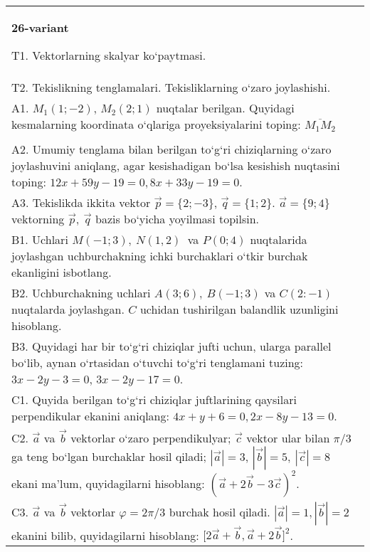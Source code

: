 \documentclass{article}
\begin{document}
\begin{tabular}{m{17cm}}
\textbf{26-variant}

T1. 
Vektorlarning skalyar ko‘paytmasi.
 \\
T2. 
Tekislikning tenglamalari. Tekisliklarning o‘zaro joylashishi.
 \\
A1. 
$M_1 (1; -2) $, $M_2 (2; 1) $ nuqtalar berilgan.
Quyidagi kesmalarning koordinata o‘qlariga proyeksiyalarini toping: $\overline{M_1M_2}$ \\
 \\
A2. 
Umumiy tenglama bilan berilgan to‘g‘ri chiziqlarning
o‘zaro joylashuvini aniqlang, agar kesishadigan bo‘lsa kesishish nuqtasini
toping: $12x+59y-19=0, 8x+33y-19=0$.
 \\
A3. 
Tekislikda ikkita vektor
$\overrightarrow{p} = \{ 2; - 3\}$, $\overrightarrow{q} = \{ 1;2\}$.
$\overrightarrow{a} = \{9;4\}$ vektorning
$\overrightarrow{p},\ \overrightarrow{q}$ bazis bo‘yicha yoyilmasi topilsin.
 \\
B1. 
Uchlari \(M (-1;3),\ N (1,2) \ \) va \(P (0;4) \)
nuqtalarida joylashgan uchburchakning ichki burchaklari o‘tkir burchak
ekanligini isbotlang.
 \\
B2. 
Uchburchakning uchlari \(A (3;6),\ B (-1;3) \) va
\(C (2:-1) \) nuqtalarda joylashgan. $C$ uchidan tushirilgan balandlik uzunligini hisoblang.
 \\
B3. 
Quyidagi har bir to‘g‘ri chiziqlar jufti uchun, ularga parallel
bo‘lib, aynan o‘rtasidan o‘tuvchi to‘g‘ri tenglamani tuzing: $3x-2y-3=0$, $3x-2y-17=0$.
 \\
C1. 
Quyida berilgan to‘g‘ri chiziqlar juftlarining qaysilari
perpendikular ekanini aniqlang: $4x+y+6=0, 2x-8y-13=0$.
 \\
C2. 
$\vec{a}$ va $\vec{b}$ vektorlar o‘zaro perpendikulyar; $\vec{c}$ vektor ular bilan $\pi/3$ ga teng bo‘lgan burchaklar hosil qiladi; $|\vec{a}| = 3$, $|\vec{b}| = 5,\ |\vec{c}| = 8$ ekani ma’lum, quyidagilarni hisoblang:
$ (\vec{a} + 2\vec{b} - 3\vec{c}) ^{2}$.
 \\
C3. 
$\vec{a}$ va $\vec{b}$ vektorlar $\varphi = 2\pi/3$ burchak hosil qiladi. $|\vec{a}| = 1,|\vec{b}| = 2$ ekanini bilib, quyidagilarni hisoblang:
$\lbrack 2\overrightarrow{a} + \overrightarrow{b},\overrightarrow{a} + 2\overrightarrow{b}\rbrack^{2}$.
 \\

\end{tabular}
\vspace{1cm}
\end{document}
